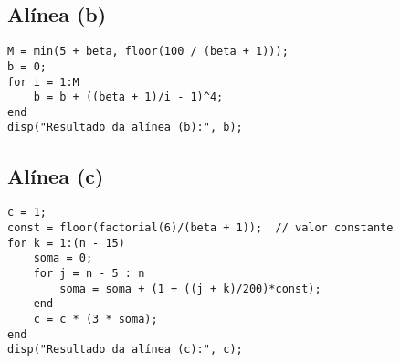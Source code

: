 \subsection*{Alínea (b)}
\begin{verbatim}
M = min(5 + beta, floor(100 / (beta + 1)));
b = 0;
for i = 1:M
    b = b + ((beta + 1)/i - 1)^4;
end
disp("Resultado da alínea (b):", b);
\end{verbatim}

\subsection*{Alínea (c)}
\begin{verbatim}
c = 1;
const = floor(factorial(6)/(beta + 1));  // valor constante
for k = 1:(n - 15)
    soma = 0;
    for j = n - 5 : n
        soma = soma + (1 + ((j + k)/200)*const);
    end
    c = c * (3 * soma);
end
disp("Resultado da alínea (c):", c);
\end{verbatim}